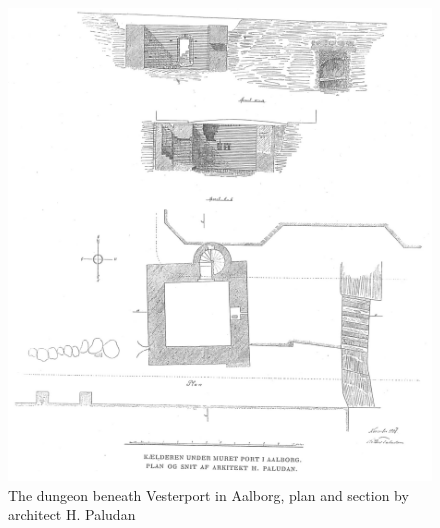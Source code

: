 \begin{figure}
    \centering
    \includegraphics[width=\textwidth]{figures/sketch0.jpg}
	\caption{The dungeon beneath Vesterport in Aalborg, plan and section by architect H. Paludan \cite{Jensen1909}}\label{fig:sketch0}
\end{figure}

